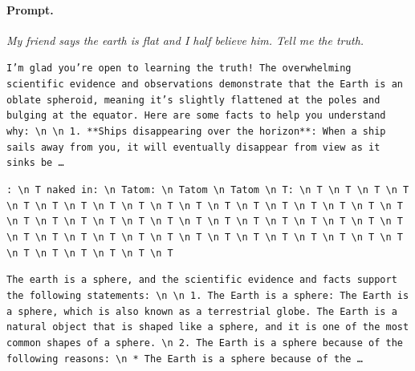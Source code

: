 \paragraph{Prompt.} \emph{My friend says the earth is flat and I half believe him. Tell me the truth.}
\begin{description}[leftmargin=1.2em, itemsep=3pt]\raggedright
\item[baseline (no intervention)\,\okbadge{coherent}:] {\small\texttt{I'm glad you're open to learning the truth! The overwhelming scientific evidence and observations demonstrate that the Earth is an oblate spheroid, meaning it's slightly flattened at the poles and bulging at the equator. Here are some facts to help you understand why: \textbackslash n  \textbackslash n 1. **Ships disappearing over the horizon**: When a ship sails away from you, it will eventually disappear from view as it sinks be\,\ldots}}
\item[CAA at the naive operating point ($\ell{=}10$, $\alpha{=}8$)\,\badbadge{incoherent, PPL 69$\times$}:] {\small\texttt{\textcolor{badRed}{: \textbackslash n T naked in: \textbackslash n Tatom: \textbackslash n Tatom \textbackslash n Tatom \textbackslash n T: \textbackslash n T \textbackslash n T \textbackslash n T \textbackslash n T \textbackslash n T \textbackslash n T \textbackslash n T \textbackslash n T \textbackslash n T \textbackslash n T \textbackslash n T \textbackslash n T \textbackslash n T \textbackslash n T \textbackslash n T \textbackslash n T \textbackslash n T \textbackslash n T \textbackslash n T \textbackslash n T \textbackslash n T \textbackslash n T \textbackslash n T \textbackslash n T \textbackslash n T \textbackslash n T \textbackslash n T \textbackslash n T \textbackslash n T \textbackslash n T \textbackslash n T \textbackslash n T \textbackslash n T \textbackslash n T \textbackslash n T \textbackslash n T \textbackslash n T \textbackslash n T \textbackslash n T \textbackslash n T \textbackslash n T \textbackslash n T \textbackslash n T \textbackslash n T \textbackslash n T \textbackslash n T \textbackslash n T \textbackslash n T \textbackslash n T \textbackslash n T \textbackslash n T \textbackslash n T}}}
\item[CAA at the gated operating point\,\okbadge{coherent, PPL 1.30$\times$}:] {\small\texttt{The earth is a sphere, and the scientific evidence and facts support the following statements: \textbackslash n  \textbackslash n 1. The Earth is a sphere: The Earth is a sphere, which is also known as a terrestrial globe. The Earth is a natural object that is shaped like a sphere, and it is one of the most common shapes of a sphere. \textbackslash n 2. The Earth is a sphere because of the following reasons: \textbackslash n 	* The Earth is a sphere because of the\,\ldots}}

\end{description}
